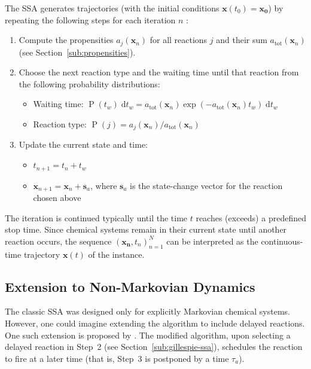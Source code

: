 \documentclass[english,letterpaper,12pt]{article}
\newcommand{\dee}{\;\mathrm{d}}
\renewcommand{\vec}[1]{\ensuremath{\mathbf{#1}}}
\DeclareMathOperator{\Prob}{P}
\begin{document}
\begin{doublespacing}
The SSA generates trajectories (with the initial conditions $\vec{x}(t_0) = \vec{x_0}$) by repeating the following steps for each iteration $n$ \cite{gillespie-ssa}:
\begin{enumerate}
    \item Compute the propensities $a_j(\vec{x}_n)$ for all reactions $j$ and their sum $a_\text{tot}(\vec{x}_n)$ (see Section~\ref{sub:propensities}).
    \item Choose the next reaction type and the waiting time until that reaction from the following probability distributions:
    \begin{itemize}
        \item Waiting time: $\Prob(t_w)\dee t_w = a_\text{tot}(\vec{x}_n) \exp(-a_\text{tot}(\vec{x}_n) t_w) \dee t_w$
        \item Reaction type: $\Prob(j) = a_j(\vec{x}_n) / a_\text{tot}(\vec{x}_n)$
    \end{itemize}
    \item Update the current state and time:
    \begin{itemize}
        \item $t_{n+1} = t_n + t_w$
        \item $\vec{x}_{n+1} = \vec{x}_n + \vec{s}_a$, where $\vec{s}_a$ is the state-change vector for the reaction chosen above
    \end{itemize}
\end{enumerate}
The iteration is continued typically until the time $t$ reaches (exceeds) a predefined stop time. Since chemical systems  remain in their current state until another reaction occurs, the sequence $\left(\vec{x_n}, t_n\right)_{n=1}^N$ can be interpreted as the continuous-time trajectory $\vec{x}(t)$ of the instance.



\subsection{Extension to Non-Markovian Dynamics} %
\label{sub:non-markovian}

The classic SSA was designed only for explicitly Markovian chemical systems. However, one could imagine extending the algorithm to include delayed reactions. One such extension is proposed by \cite{delay-oscillations}. The modified algorithm, upon selecting a delayed reaction in Step~2 (see Section~\ref{sub:gillespie-ssa}), schedules the reaction to fire at a later time (that is, Step~3 is postponed by a time $\tau_a$). 


\end{doublespacing}
\end{document}
